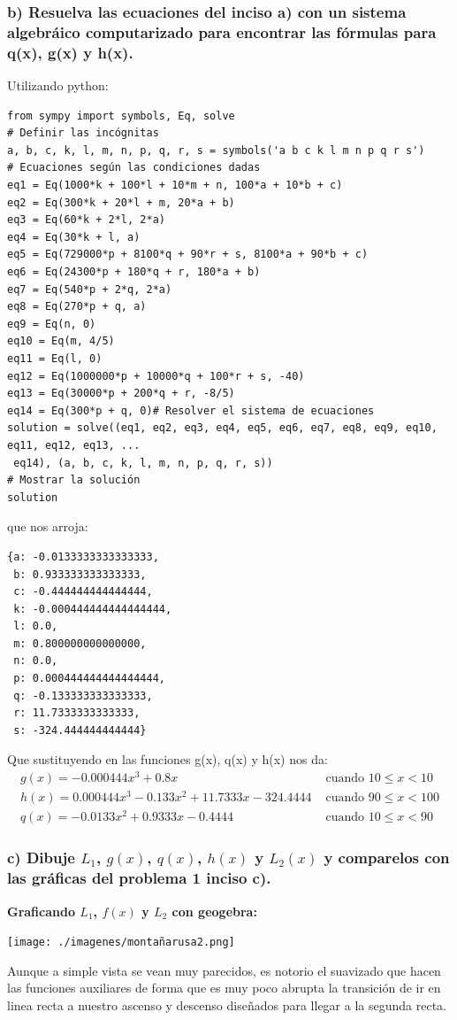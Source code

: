 \documentclass[11pt,letterpaper]{article}
\begin{document}
\subsubsection*{b) Resuelva las ecuaciones del inciso a) con un sistema algebráico computarizado para encontrar las fórmulas para q(x), g(x) y h(x).}
Utilizando python:
\begin{verbatim}
from sympy import symbols, Eq, solve
# Definir las incógnitas
a, b, c, k, l, m, n, p, q, r, s = symbols('a b c k l m n p q r s')
# Ecuaciones según las condiciones dadas
eq1 = Eq(1000*k + 100*l + 10*m + n, 100*a + 10*b + c)
eq2 = Eq(300*k + 20*l + m, 20*a + b)
eq3 = Eq(60*k + 2*l, 2*a)
eq4 = Eq(30*k + l, a)
eq5 = Eq(729000*p + 8100*q + 90*r + s, 8100*a + 90*b + c)
eq6 = Eq(24300*p + 180*q + r, 180*a + b)
eq7 = Eq(540*p + 2*q, 2*a)
eq8 = Eq(270*p + q, a)
eq9 = Eq(n, 0)
eq10 = Eq(m, 4/5)
eq11 = Eq(l, 0)
eq12 = Eq(1000000*p + 10000*q + 100*r + s, -40)
eq13 = Eq(30000*p + 200*q + r, -8/5)
eq14 = Eq(300*p + q, 0)# Resolver el sistema de ecuaciones
solution = solve((eq1, eq2, eq3, eq4, eq5, eq6, eq7, eq8, eq9, eq10, eq11, eq12, eq13, ...
 eq14), (a, b, c, k, l, m, n, p, q, r, s))
# Mostrar la solución
solution
\end{verbatim}
que nos arroja:
\begin{verbatim}
{a: -0.0133333333333333,
 b: 0.933333333333333,
 c: -0.444444444444444,
 k: -0.000444444444444444,
 l: 0.0,
 m: 0.800000000000000,
 n: 0.0,
 p: 0.000444444444444444,
 q: -0.133333333333333,
 r: 11.7333333333333,
 s: -324.444444444444}
\end{verbatim}
Que sustituyendo en las funciones g(x), q(x) y h(x) nos da:
\begin{equation*}
  \begin{split}
    g(x)=-0.000444x^3+0.8x &\text{  cuando  } 10 \leq x < 10 \\
    h(x)=0.000444x^3-0.133x^2+11.7333x-324.4444 &\text{  cuando  } 90 \leq x < 100 \\
    q(x) = -0.0133x^2+0.9333x-0.4444 &\text{  cuando  } 10 \leq x < 90
  \end{split}
\end{equation*}
\subsubsection*{c) Dibuje $L_1$, $g(x)$, $q(x)$, $h(x)$ y $L_2(x)$ y comparelos con las gráficas del problema 1 inciso c).}
\textbf{Graficando $L_1$, $f(x)$ y $L_2$ con geogebra:}
\begin{center}
  \texttt{[image: ./imagenes/montañarusa2.png]}
\end{center}
Aunque a simple vista se vean muy parecidos, es notorio el suavizado que hacen las funciones auxiliares de forma que es muy poco abrupta la transición de ir en linea recta a nuestro ascenso y descenso diseñados para llegar a la segunda recta.
\end{document}
